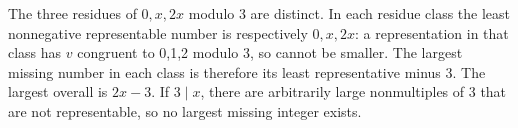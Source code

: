 The three residues of $0,x,2x$ modulo 3 are distinct. In each residue class the least nonnegative representable number is respectively $0,x,2x$: a representation in that class has $v$ congruent to 0,1,2 modulo 3, so cannot be smaller. The largest missing number in each class is therefore its least representative minus 3. The largest overall is $\boxed{2x-3}$. If $3\mid x$, there are arbitrarily large nonmultiples of 3 that are not representable, so no largest missing integer exists.
